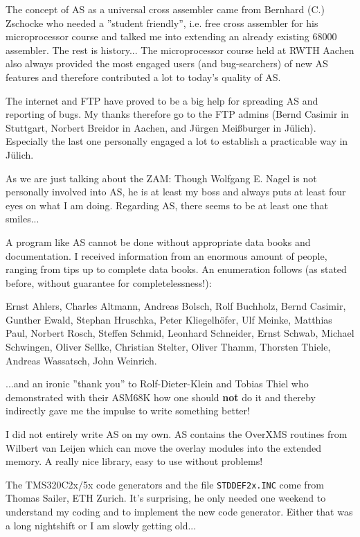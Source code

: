 \documentclass[12pt,twoside]{report}
\newcommand{\bb}[1]{{\bf #1}}
\newcommand{\tty}[1]{{\tt #1}}
\begin{document}
The concept of AS as a universal cross assembler came from Bernhard
(C.) Zschocke who needed a ''student friendly'', i.e. free cross
assembler for his microprocessor course and talked me into extending
an already existing 68000 assembler.  The rest is history...
The microprocessor course held at RWTH Aachen also always provided the
most engaged users (and bug-searchers) of new AS features and
therefore contributed a lot to today's quality of AS.

The internet and FTP have proved to be a big help for spreading AS and
reporting of bugs.  My thanks therefore go to the FTP admins (Bernd
Casimir in Stuttgart, Norbert Breidor in Aachen, and J\"urgen Mei\ss\-burger
in J\"ulich).  Especially the last one personally engaged a lot to
establish a practicable way in J\"ulich.

As we are just talking about the ZAM: Though Wolfgang E. Nagel is not
personally involved into AS, he is at least my boss and always puts
at least four eyes on what I am doing.  Regarding AS, there seems to
be at least one that smiles...

A program like AS cannot be done without appropriate data books and
documentation.  I received information from an enormous amount of
people, ranging from tips up to complete data books.  An enumeration
follows (as stated before, without guarantee for completelessness!):

Ernst Ahlers, Charles Altmann, Andreas Bolsch, Rolf Buchholz, Bernd Casimir,
Gunther Ewald, Stephan Hruschka, Peter Kliegelh\"ofer, Ulf Meinke,
Matthias Paul, Norbert Rosch, Steffen Schmid, Leonhard Schneider,
Ernst Schwab, Michael Schwingen, Oliver Sellke, Christian Stelter,
Oliver Thamm, Thorsten Thiele, Andreas Wassatsch, John Weinrich.

...and an ironic ''thank you'' to Rolf-Dieter-Klein and Tobias Thiel who
demonstrated with their ASM68K how one should \bb{not} do it and thereby
indirectly gave me the impulse to write something better!

I did not entirely write AS on my own. AS contains the OverXMS
routines from Wilbert van Leijen which can move the overlay modules
into the extended memory.  A really nice library, easy to use without
problems!

The TMS320C2x/5x code generators and the file \tty{STDDEF2x.INC} come
from Thomas Sailer, ETH Zurich.  It's surprising, he only needed one
weekend to understand my coding and to implement the new code generator. 
Either that was a long nightshift or I am slowly getting old...
\end{document}
